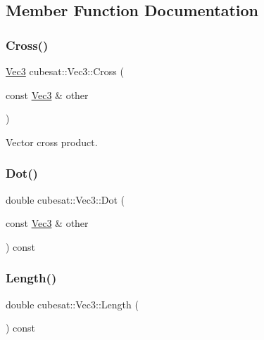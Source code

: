 \subsection{Member Function Documentation}
\mbox{\label{structcubesat_1_1Vec3_a698430b60dd526e9684d0581917d9a62}} 
\subsubsection{\texorpdfstring{Cross()}{Cross()}}
{\footnotesize\ttfamily \hyperlink{structcubesat_1_1Vec3}{Vec3} cubesat\+::\+Vec3\+::\+Cross (\begin{DoxyParamCaption}\item[{const \hyperlink{structcubesat_1_1Vec3}{Vec3} \&}]{other }\end{DoxyParamCaption})\hspace{0.3cm}{\ttfamily [inline]}}



Vector cross product. 

\mbox{\label{structcubesat_1_1Vec3_a12820bea7598591bcab475198f5ee79a}} 
\subsubsection{\texorpdfstring{Dot()}{Dot()}}
{\footnotesize\ttfamily double cubesat\+::\+Vec3\+::\+Dot (\begin{DoxyParamCaption}\item[{const \hyperlink{structcubesat_1_1Vec3}{Vec3} \&}]{other }\end{DoxyParamCaption}) const\hspace{0.3cm}{\ttfamily [inline]}}

\mbox{\label{structcubesat_1_1Vec3_ab3e281e138bce0589ad4aaa328fe6b39}} 
\subsubsection{\texorpdfstring{Length()}{Length()}}
{\footnotesize\ttfamily double cubesat\+::\+Vec3\+::\+Length (\begin{DoxyParamCaption}{ }\end{DoxyParamCaption}) const\hspace{0.3cm}{\ttfamily [inline]}}




